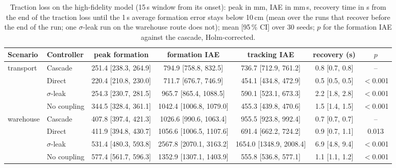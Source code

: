 \begin{table}[htbp]\centering\small
\caption{Traction loss on the high-fidelity model (15\,s window from its onset): peak in mm, IAE in mm\,s, recovery time in s from the end of the traction loss until the 1\,s average formation error stays below 10\,cm (mean over the runs that recover before the end of the run; one $\sigma$-leak run on the warehouse route does not); mean [95\,\% CI] over 30 seeds; $p$ for the formation IAE against the cascade, Holm-corrected.}\label{tab:r2_event}
\begin{adjustbox}{max width=\linewidth}
\begin{tabular}{@{}llccccc@{}}\toprule
Scenario & Controller & peak formation & formation IAE & tracking IAE & recovery (s) & $p$\\\midrule
transport & Cascade & 251.4 [238.3, 264.9] & 794.9 [758.8, 832.5] & 736.7 [712.9, 761.2] & 0.8 [0.7, 0.8] & --\\
 & Direct & 220.4 [210.8, 230.0] & 711.7 [676.7, 746.9] & 454.1 [434.8, 472.9] & 0.5 [0.5, 0.5] & $<$0.001\\
 & $\sigma$-leak & 254.3 [230.7, 281.5] & 965.7 [865.4, 1088.5] & 590.1 [523.1, 673.3] & 2.2 [1.8, 2.8] & $<$0.001\\
 & No coupling & 344.5 [328.4, 361.1] & 1042.4 [1006.8, 1079.0] & 455.3 [439.8, 470.6] & 1.5 [1.4, 1.5] & $<$0.001\\
\addlinespace
warehouse & Cascade & 407.8 [397.4, 421.3] & 1026.6 [990.6, 1063.4] & 955.5 [923.8, 992.4] & 0.7 [0.7, 0.7] & --\\
 & Direct & 411.9 [394.8, 430.7] & 1056.6 [1006.5, 1107.6] & 691.4 [662.2, 724.2] & 0.9 [0.7, 1.1] & 0.013\\
 & $\sigma$-leak & 531.4 [480.3, 593.8] & 2567.8 [2070.1, 3163.2] & 1654.0 [1348.9, 2008.4] & 6.9 [4.8, 9.4] & $<$0.001\\
 & No coupling & 577.4 [561.7, 596.3] & 1352.9 [1307.1, 1403.9] & 555.8 [536.8, 577.1] & 1.1 [1.1, 1.2] & $<$0.001\\
\bottomrule\end{tabular}
\end{adjustbox}
\end{table}
